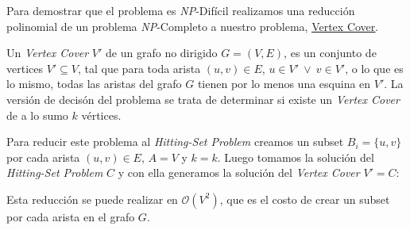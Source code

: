 Para demostrar que el problema es \textit{NP}-Dif\'icil realizamos una
reducci\'on polinomial de un problema \textit{NP}-Completo a nuestro problema,
\href{https://en.wikipedia.org/wiki/Vertex_cover}{\underline{Vertex Cover}}.

Un \textit{Vertex Cover} $V'$ de un grafo no dirigido $G = (V, E)$, es un
conjunto de vertices $V' \subseteq V$, tal que para toda arista $(u, v) \in E$,
$u \in V'\ \lor\ v \in V'$, o lo que es lo mismo, todas las aristas del grafo $G$
tienen por lo menos una esquina en $V'$. La versi\'on de decis\'on del problema
se trata de determinar si existe un \textit{Vertex Cover} de a lo sumo $k$
v\'ertices.

Para reducir este problema al \textit{Hitting-Set Problem} creamos un subset
$B_i = \{ u, v \}$ por cada arista $(u, v) \in E$, $A = V$ y $k = k$. Luego
tomamos la soluci\'on del \textit{Hitting-Set Problem} $C$ y con ella generamos
la soluci\'on del \textit{Vertex Cover} $V' = C$:



Esta reducci\'on se puede realizar en $\mathcal{O}(V^2)$, que es el costo de
crear un subset por cada arista en el grafo $G$.
